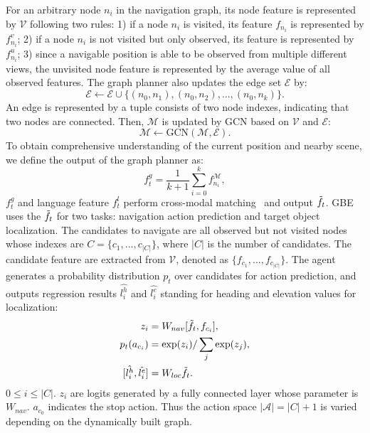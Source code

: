 \documentclass[final]{cvpr}
\begin{document}
For an arbitrary node $n_i$ in the navigation graph, its node feature is represented by $\mathcal{V}$ following two rules: 
1) if a node $n_i$ is visited, its feature $f_{n_i}$ is represented by $f^{v}_{n_i}$; 
2) if a node $n_i$ is not visited but only observed, its feature is represented by $f^{u}_{n_i}$; 
3) since a navigable position is able to be observed from multiple different views, the unvisited node feature is represented by the average value of all observed features. 
The graph planner also updates the edge set $\mathcal{E}$ by:
\begin{equation}
\mathcal{E} \leftarrow \mathcal{E} \cup \{(n_0, n_1),(n_0, n_2),...,(n_0, n_k)\}. 
\end{equation}
An edge is represented by a tuple consists of two node indexes, indicating that two nodes are connected. 
Then, $\mathcal{M}$ is updated by GCN based on $\mathcal{V}$ and $\mathcal{E}$: 
\begin{equation}
\mathcal{M} \leftarrow \mathrm{GCN}(\mathcal{M}, \mathcal{E}). 
\end{equation}
To obtain comprehensive understanding of the current position and nearby scene, 
we define the output of the graph planner as: 
\begin{equation}
f^g_t =  \frac{1}{k+1} \sum_{i=0}^{k} f^{\mathcal{M}}_{n_i}, 
\end{equation}
$f^g_t$ and language feature $f_t^l$ perform cross-modal matching~\cite{wang2018reinforced} and output $\Tilde{f_t}$. 
GBE uses the $\Tilde{f_t}$ for two tasks: navigation action prediction and target object localization. 
The candidates to navigate are all observed but not visited nodes whose indexes are $C = \{c_1,...,c_{|C|}\}$, where $|C|$ is the number of candidates. 
The candidate feature are extracted from $\mathcal{V}$, denoted as $\{f_{c_1},...,f_{c_{|C|}}\}$. 
The agent generates a probability distribution $p_t$ over candidates for action prediction, and outputs regression results $\hat{l^h_i}$ and $\hat{l^e_i}$ standing for heading and elevation values for localization: 
\begin{equation}
\begin{split}
    z_i &= W_{nav} [\Tilde{f_t}, f_{c_i}], \\
    p_t(a_{c_i}) &= \mathrm{exp}(z_i) / \sum_j \mathrm{exp}(z_j), \\
    [\hat{l^h_i}, \hat{l^e_i}] &= W_{loc} \Tilde{f_t}. \\
\end{split}
\label{eq:prediction}
\end{equation}
$0\le i \le |C|$. $z_i$ are logits generated by a fully connected layer whose parameter is  $W_{nav}$. $a_{c_0}$ indicates the stop action. Thus the action space $|\mathcal{A}| = |C| + 1$ is varied depending on the dynamically built graph. 
\end{document}
